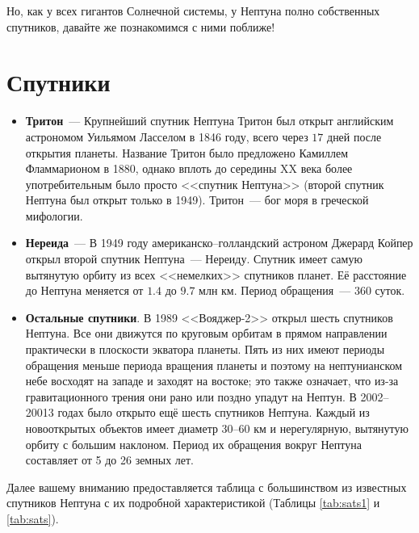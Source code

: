 \documentclass[12pt]{article}
\numberwithin{equation}{section} %
\theoremstyle{definition}\newtheorem{defi}{Определение}
\begin{document}
Но, как у всех гигантов Солнечной системы, у Нептуна полно собственных спутников, давайте же познакомимся с ними поближе!

\section{Спутники}

\begin{itemize}
  \item \textbf{Тритон}~--- Крупнейший спутник Нептуна Тритон был открыт английским астрономом Уильямом Ласселом в 1846 году, всего через $17$ дней после открытия планеты. Название Тритон было предложено Камиллем Фламмарионом в 1880, однако вплоть до середины XX века более употребительным было просто <<спутник Нептуна>> (второй спутник Нептуна был открыт только в 1949). Тритон~--- бог моря в греческой мифологии.
  \item \textbf{Нереида}~--- В 1949 году американско--голландский астроном Джерард Койпер открыл второй спутник Нептуна~--- Нереиду. Спутник имеет самую вытянутую орбиту из всех <<немелких>> спутников планет. Её расстояние до Нептуна меняется от $1.4$ до $9.7$ млн км. Период обращения~--- $360$ суток.
  \item \textbf{Остальные спутники}. В 1989 <<Вояджер-2>> открыл шесть спутников Нептуна. Все они движутся по круговым орбитам в прямом направлении практически в плоскости экватора планеты. Пять из них имеют периоды обращения меньше периода вращения планеты и поэтому на нептунианском небе восходят на западе и заходят на востоке; это также означает, что из-за гравитационного трения они рано или поздно упадут на Нептун. В 2002--20013 годах было открыто ещё шесть спутников Нептуна. Каждый из новооткрытых объектов имеет диаметр $30$--$60$ км и нерегулярную, вытянутую орбиту с большим наклоном. Период их обращения вокруг Нептуна составляет от 5 до 26 земных лет.
\end{itemize}

Далее вашему вниманию предоставляется таблица с большинством из известных спутников Нептуна с их подробной характеристикой (Таблицы \ref{tab:sats1} и \ref{tab:sats}).
\end{document}
